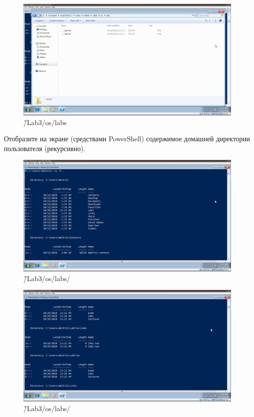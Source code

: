 \documentclass[a4paper]{article}
\begin{document}
\begin{figure}[H]
    \centering
    \includegraphics[width=\linewidth]{7.png}
    \caption{\~/Lab3/os/labs}
\end{figure}

Отобразите на экране (средствами PowerShell) содержимое домашней директории пользователя (рекурсивно).

\begin{figure}[H]
    \centering
    \includegraphics[width=\linewidth]{4.png}
    \caption{\~/Lab3/os/labs/}
\end{figure}


\begin{figure}[H]
    \centering
    \includegraphics[width=\linewidth]{8.png}
    \caption{\~/Lab3/os/labs/}
\end{figure}
\end{document}
